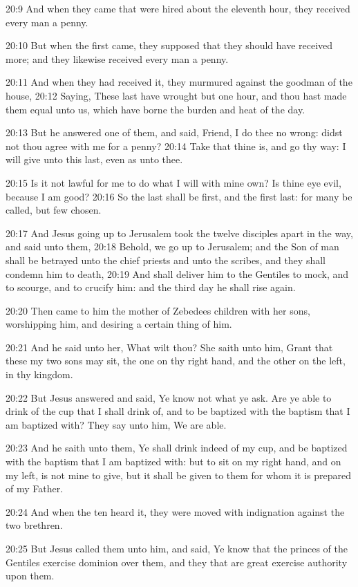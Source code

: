 20:9 And when they came that were hired about the eleventh hour, they
received every man a penny.

20:10 But when the first came, they supposed that they should have
received more; and they likewise received every man a penny.

20:11 And when they had received it, they murmured against the goodman
of the house, 20:12 Saying, These last have wrought but one hour, and
thou hast made them equal unto us, which have borne the burden and
heat of the day.

20:13 But he answered one of them, and said, Friend, I do thee no
wrong: didst not thou agree with me for a penny?  20:14 Take that
thine is, and go thy way: I will give unto this last, even as unto
thee.

20:15 Is it not lawful for me to do what I will with mine own? Is
thine eye evil, because I am good?  20:16 So the last shall be first,
and the first last: for many be called, but few chosen.

20:17 And Jesus going up to Jerusalem took the twelve disciples apart
in the way, and said unto them, 20:18 Behold, we go up to Jerusalem;
and the Son of man shall be betrayed unto the chief priests and unto
the scribes, and they shall condemn him to death, 20:19 And shall
deliver him to the Gentiles to mock, and to scourge, and to crucify
him: and the third day he shall rise again.

20:20 Then came to him the mother of Zebedees children with her sons,
worshipping him, and desiring a certain thing of him.

20:21 And he said unto her, What wilt thou? She saith unto him, Grant
that these my two sons may sit, the one on thy right hand, and the
other on the left, in thy kingdom.

20:22 But Jesus answered and said, Ye know not what ye ask. Are ye
able to drink of the cup that I shall drink of, and to be baptized
with the baptism that I am baptized with? They say unto him, We are
able.

20:23 And he saith unto them, Ye shall drink indeed of my cup, and be
baptized with the baptism that I am baptized with: but to sit on my
right hand, and on my left, is not mine to give, but it shall be given
to them for whom it is prepared of my Father.

20:24 And when the ten heard it, they were moved with indignation
against the two brethren.

20:25 But Jesus called them unto him, and said, Ye know that the
princes of the Gentiles exercise dominion over them, and they that are
great exercise authority upon them.

